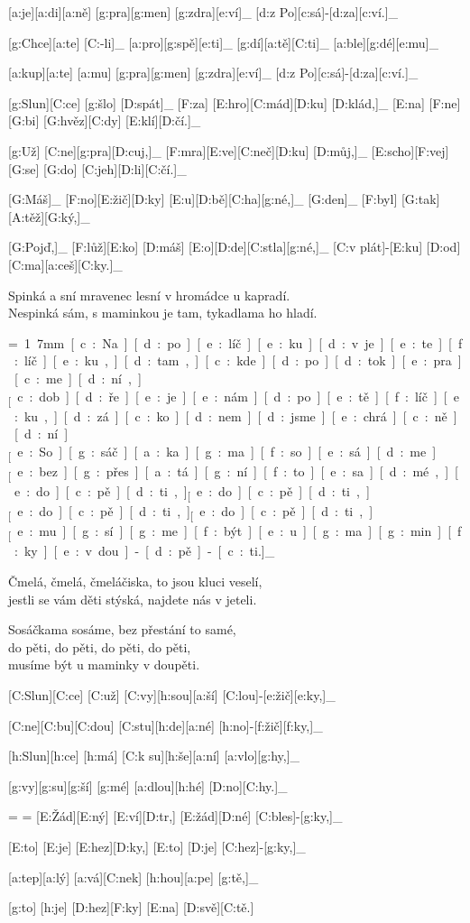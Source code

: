 [a:je][a:di][a:ně] [g:pra][g:men] [g:zdra][e:ví]_
[d:z Po][c:sá]-[d:za][c:ví.]_

[g:Chce][a:te] [C:-li]_ [a:pro][g:spě][e:ti]_
[g:dí][a:tě][C:ti]_ [a:ble][g:dé][e:mu]_

[a:kup][a:te] [a:mu] [g:pra][g:men] [g:zdra][e:ví]_
[d:z Po][c:sá]-[d:za][c:ví.]_



[g:Slun][C:ce] [g:šlo] [D:spát]_ [F:za] [E:hro][C:mád][D:ku] [D:klád,]_
[E:na] [F:ne][G:bi] [G:hvěz][C:dy] [E:klí][D:čí.]_

[g:Už] [C:ne][g:pra][D:cuj,]_ [F:mra][E:ve][C:neč][D:ku] [D:můj,]_
[E:scho][F:vej] [G:se] [G:do] [C:jeh][D:li][C:čí.]_

[G:Máš]_ [F:no][E:žič][D:ky] [E:u][D:bě][C:ha][g:né,]_
[G:den]_ [F:byl] [G:tak] [A:těž][G:ký,]_

[G:Pojď,]_ [F:lůž][E:ko] [D:máš] [E:o][D:de][C:stla][g:né,]_
[C:v plát]-[E:ku] [D:od] [C:ma][a:ceš][C:ky.]_

Spinká a sní mravenec lesní
v hromádce u kapradí. \\
Nespinká sám, s maminkou je tam,
tykadlama ho hladí.



{\unit=1.7mm
[c:Na] [d:po][e:líč][e:ku] [d:v je][e:te][f:líč][e:ku,] %
[d:tam,] [c:kde] [d:po][d:tok] [e:pra][c:me][d:ní,]_

[c:dob][d:ře] [e:je] [e:nám] [d:po] [e:tě][f:líč][e:ku,] %
[d:zá][c:ko][d:nem] [d:jsme] [e:chrá][c:ně][d:ní.]_

[e:So][g:sáč][a:ka][g:ma] [f:so][e:sá][d:me]_
[e:bez] [g:přes][a:tá][g:ní] [f:to] [e:sa][d:mé,]_

\unit
[e:do] [c:pě][d:ti,]_
[e:do] [c:pě][d:ti,]_
[e:do] [c:pě][d:ti,]_
[e:do] [c:pě][d:ti,]_

[e:mu][g:sí][g:me] [f:být] [e:u] [g:ma][g:min][f:ky] %
[e:v dou]-[d:pě]-[c:ti.]_
}

Čmelá, čmelá, čmeláčiska,
to jsou kluci veselí,\\
jestli se vám děti stýská,
najdete nás v jeteli.

Sosáčkama sosáme,
bez přestání to samé,\\
do pěti, do pěti,
do pěti, do pěti,\\
musíme být u maminky v doupěti.



{\minw=6mm
[C:Slun][C:ce] [C:už] [C:vy][h:sou][a:ší] [C:lou]-[e:žič][e:ky,]_

[C:ne][C:bu][C:dou] [C:stu][h:de][a:né] [h:no]-[f:žič][f:ky,]_

[h:Slun][h:ce] [h:má] [C:k su][h:še][a:ní] [a:vlo][g:hy,]_

[g:vy][g:su][g:ší] [g:mé] [a:dlou][h:hé] [D:no][C:hy.]_

\break
\min=
\max=
[E:Žád][E:ný] [E:ví][D:tr,] [E:žád][D:né] [C:bles]-[g:ky,]_

[E:to] [E:je] [E:hez][D:ky,] [E:to] [D:je] [C:hez]-[g:ky,]_

[a:tep][a:lý] [a:vá][C:nek] [h:hou][a:pe] [g:tě,]_

[g:to] [h:je] [D:hez][F:ky] [E:na] [D:svě][C:tě.] %
}

